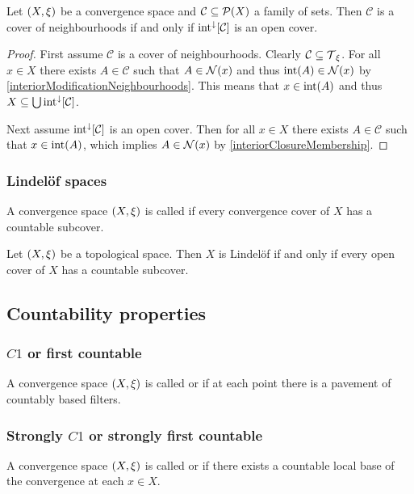 \begin{lemma}
Let $\sSet{X,\xi}$ be a convergence space and $\mathcal{C}\subseteq \operatorname{\mathcal{P}}(X)$ a family of sets. Then $\mathcal{C}$ is a cover of neighbourhoods \textup{if and only if} $\operatorname{int}^\downarrow[\mathcal{C}]$ is an open cover.
\end{lemma}
\begin{proof}
First assume $\mathcal{C}$ is a cover of neighbourhoods. Clearly $\mathcal{C} \subseteq \operatorname{\mathcal{T}}_\xi$. For all $x\in X$ there exists $A\in \mathcal{C}$ such that $A\in \operatorname{\mathcal{N}}(x)$ and thus $\operatorname{int}(A) \in \operatorname{\mathcal{N}}(x)$ by \ref{interiorModificationNeighbourhoods}. This means that $x\in \operatorname{int}(A)$ and thus $X\subseteq \bigcup\operatorname{int}^\downarrow[\mathcal{C}]$.

Next assume $\operatorname{int}^\downarrow[\mathcal{C}]$ is an open cover. Then for all $x\in X$ there exists $A\in \mathcal{C}$ such that $x\in \operatorname{int}(A)$, which implies $A\in \operatorname{\mathcal{N}}(x)$ by \ref{interiorClosureMembership}.
\end{proof}

\subsubsection{Lindelöf spaces}
\begin{definition}
A convergence space $\sSet{X, \xi}$ is called  if every convergence cover of $X$ has a countable subcover.
\end{definition}

\begin{lemma}
Let $\sSet{X, \xi}$ be a topological space. Then $X$ is Lindelöf \textup{if and only if} every open cover of $X$ has a countable subcover.
\end{lemma}

\subsection{Countability properties}
\subsubsection{$C1$ or first countable}
\begin{definition}
A convergence space $\sSet{X, \xi}$ is called  or  if at each point there is a pavement of countably based filters.
\end{definition}

\subsubsection{Strongly $C1$ or strongly first countable}
\begin{definition}
A convergence space $\sSet{X, \xi}$ is called  or  if there exists a countable local base of the convergence at each $x\in X$.
\end{definition}

